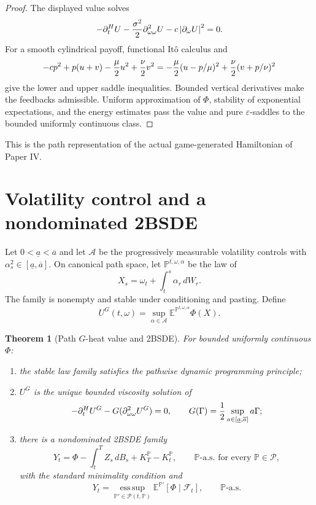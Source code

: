 \documentclass[11pt,reqno]{amsart}
\newtheorem{theorem}{Theorem}[section]
\theoremstyle{definition}
\theoremstyle{remark}
\newcommand{\A}{\mathcal A}
\newcommand{\E}{\mathbb E}
\newcommand{\F}{\mathcal F}
\newcommand{\Pp}{\mathbb P}
\newcommand{\cP}{\mathcal P}
\newcommand{\esssup}{\operatorname*{ess\,sup}}
\newcommand{\abs}[1]{\left\lvert #1\right\rvert}
\begin{document}
\begin{proof}
The displayed value solves
\[
 -\partial_t^HU-{\sigma^2\over2}
 \partial_{\omega\omega}^2U-c\abs{\partial_\omega U}^2=0.
\]
For a smooth cylindrical payoff, functional It\^o calculus and
\[
 -cp^2+p(u+v)-{\mu\over2}u^2+{\nu\over2}v^2
 =-{\mu\over2}(u-p/\mu)^2
 +{\nu\over2}(v+p/\nu)^2
\]
give the lower and upper saddle inequalities.  Bounded vertical derivatives
make the feedbacks admissible.  Uniform approximation of $\Phi$, stability of
exponential expectations, and the energy estimates pass the value and pure
$\varepsilon$-saddles to the bounded uniformly continuous class.
\end{proof}

This is the path representation of the actual game-generated Hamiltonian of
Paper IV.

\section{Volatility control and a nondominated 2BSDE}\label{sec:2BSDE}
Let $0<\underline a<\overline a$ and let $\A$ be the progressively measurable
volatility controls with
$\alpha_s^2\in[\underline a,\overline a]$.  On canonical path space, let
$\Pp^{t,\omega,\alpha}$ be the law of
\[
 X_s=\omega_t+\int_t^s\alpha_r\,dW_r.
\]
The family is nonempty and stable under conditioning and pasting.  Define
\begin{equation}\label{eq:Gvalue}
 U^G(t,\omega)=\sup_{\alpha\in\A}
 \E^{\Pp^{t,\omega,\alpha}}\Phi(X).
\end{equation}

\begin{theorem}[Path $G$-heat value and 2BSDE]\label{thm:2BSDE}
For bounded uniformly continuous $\Phi$:
\begin{enumerate}[label=(\roman*)]
\item the stable law family satisfies the pathwise dynamic programming
principle;
\item $U^G$ is the unique bounded viscosity solution of
\[
 -\partial_t^HU^G-G(\partial_{\omega\omega}^2U^G)=0,
 \qquad
 G(\Gamma)={1\over2}
 \sup_{a\in[\underline a,\overline a]}a\Gamma;
\]
\item there is a nondominated 2BSDE family
\[
 Y_t=\Phi-\int_t^TZ_s\,dB_s+K_T^{\Pp}-K_t^{\Pp},
 \qquad \Pp\text{-a.s. for every }\Pp\in\cP,
\]
with the standard minimality condition and
\[
 Y_t=\esssup_{\Pp'\in\cP(t,\Pp)}
 \E^{\Pp'}[\Phi\mid\F_t],
 \qquad \Pp\text{-a.s.}
\]
\end{enumerate}
\end{theorem}
\end{document}
